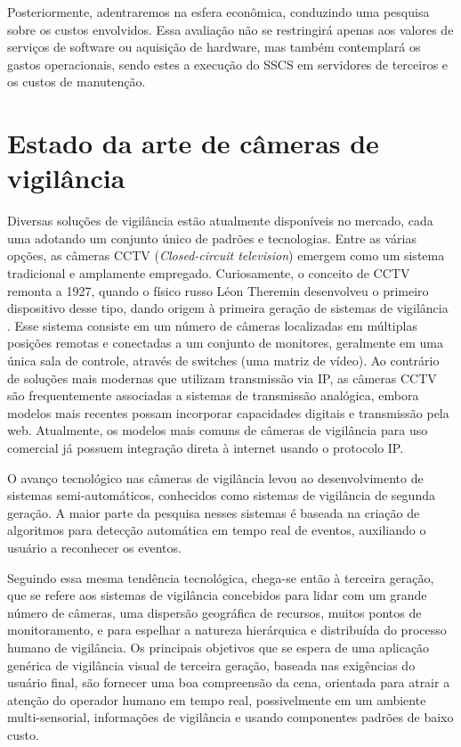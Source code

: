 \documentclass[12pt, %
openright, 
oneside, %
a4paper,    %
brazil]{facom-ufu-abntex2}
\begin{document}
Posteriormente, adentraremos na esfera econômica, conduzindo uma pesquisa sobre
os custos envolvidos. Essa avaliação não se restringirá apenas aos valores de
serviços de software ou aquisição de hardware, mas também contemplará os gastos
operacionais, sendo estes a execução do SSCS em servidores de terceiros e os
custos de manutenção.

\section{Estado da arte de câmeras de vigilância}

Diversas soluções de vigilância estão atualmente disponíveis no mercado, cada
uma adotando um conjunto único de padrões e tecnologias. Entre as várias
opções, as câmeras CCTV (\textit{\foreignlanguage{english}{Closed-circuit
		television}}) emergem como um sistema tradicional e amplamente empregado.
Curiosamente, o conceito de CCTV remonta a 1927, quando o físico russo Léon
Theremin desenvolveu o primeiro dispositivo desse tipo, dando origem à primeira
geração de sistemas de vigilância \cite{glinsky2000theremin}. Esse sistema
consiste em um número de câmeras localizadas em múltiplas posições remotas e
conectadas a um conjunto de monitores, geralmente em uma única sala de
controle, através de switches (uma matriz de vídeo). Ao contrário de soluções
mais modernas que utilizam transmissão via IP, as câmeras CCTV são
frequentemente associadas a sistemas de transmissão analógica, embora modelos
mais recentes possam incorporar capacidades digitais e transmissão pela web.
Atualmente, os modelos mais comuns de câmeras de vigilância para uso comercial
já possuem integração direta à internet usando o protocolo IP.

O avanço tecnológico nas câmeras de vigilância levou ao desenvolvimento de
sistemas semi-automáticos, conhecidos como sistemas de vigilância de segunda
geração. A maior parte da pesquisa nesses sistemas é baseada na criação de
algoritmos para detecção automática em tempo real de eventos, auxiliando o
usuário a reconhecer os eventos.

Seguindo essa mesma tendência tecnológica, chega-se então à terceira geração,
que se refere aos sistemas de vigilância concebidos para lidar com um grande
número de câmeras, uma dispersão geográfica de recursos, muitos pontos de
monitoramento, e para espelhar a natureza hierárquica e distribuída do processo
humano de vigilância. Os principais objetivos que se espera de uma aplicação
genérica de vigilância visual de terceira geração, baseada nas exigências do
usuário final, são fornecer uma boa compreensão da cena, orientada para atrair
a atenção do operador humano em tempo real, possivelmente em um ambiente
multi-sensorial, informações de vigilância e usando componentes padrões de
baixo custo.
\end{document}
